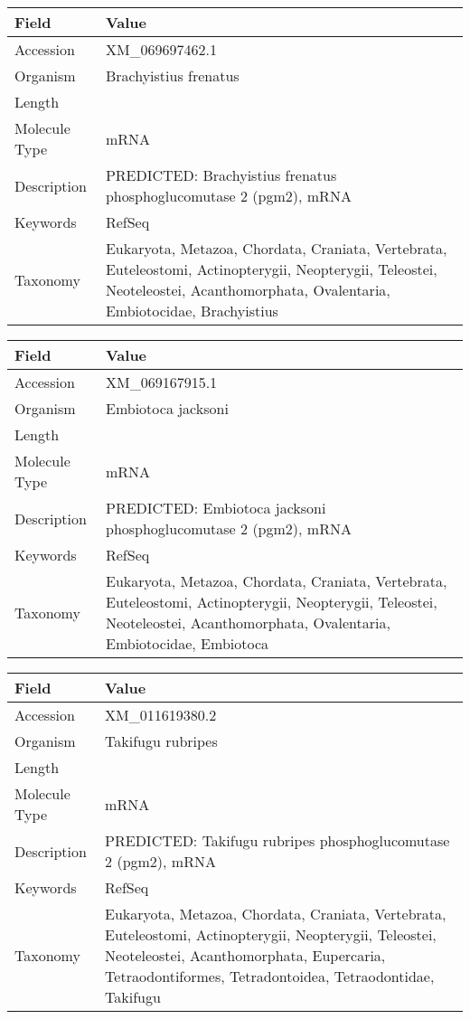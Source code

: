 \documentclass[10pt]{article}
\begin{document}
{\footnotesize
\begin{longtable}{>{\raggedright\arraybackslash}p{4.5cm} >{\raggedright\arraybackslash}p{11.5cm}}
\textbf{Field} & \textbf{Value} \\
\hline
Accession & XM\_069697462.1 \\
Organism & Brachyistius frenatus \\
Length & 2981 \\
Molecule Type & mRNA \\
Description & PREDICTED: Brachyistius frenatus phosphoglucomutase 2 (pgm2), mRNA \\
Keywords & RefSeq \\
Taxonomy & Eukaryota, Metazoa, Chordata, Craniata, Vertebrata, Euteleostomi, Actinopterygii, Neopterygii, Teleostei, Neoteleostei, Acanthomorphata, Ovalentaria, Embiotocidae, Brachyistius \\
\end{longtable}
}

{\footnotesize
\begin{longtable}{>{\raggedright\arraybackslash}p{4.5cm} >{\raggedright\arraybackslash}p{11.5cm}}
\textbf{Field} & \textbf{Value} \\
\hline
Accession & XM\_069167915.1 \\
Organism & Embiotoca jacksoni \\
Length & 2977 \\
Molecule Type & mRNA \\
Description & PREDICTED: Embiotoca jacksoni phosphoglucomutase 2 (pgm2), mRNA \\
Keywords & RefSeq \\
Taxonomy & Eukaryota, Metazoa, Chordata, Craniata, Vertebrata, Euteleostomi, Actinopterygii, Neopterygii, Teleostei, Neoteleostei, Acanthomorphata, Ovalentaria, Embiotocidae, Embiotoca \\
\end{longtable}
}

{\footnotesize
\begin{longtable}{>{\raggedright\arraybackslash}p{4.5cm} >{\raggedright\arraybackslash}p{11.5cm}}
\textbf{Field} & \textbf{Value} \\
\hline
Accession & XM\_011619380.2 \\
Organism & Takifugu rubripes \\
Length & 2812 \\
Molecule Type & mRNA \\
Description & PREDICTED: Takifugu rubripes phosphoglucomutase 2 (pgm2), mRNA \\
Keywords & RefSeq \\
Taxonomy & Eukaryota, Metazoa, Chordata, Craniata, Vertebrata, Euteleostomi, Actinopterygii, Neopterygii, Teleostei, Neoteleostei, Acanthomorphata, Eupercaria, Tetraodontiformes, Tetradontoidea, Tetraodontidae, Takifugu \\
\end{longtable}
}
\end{document}
